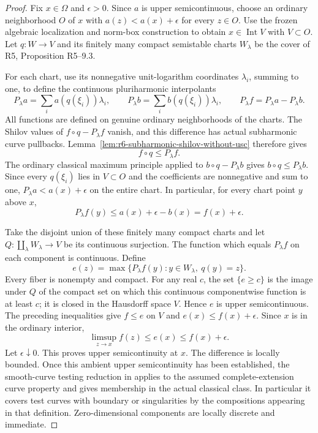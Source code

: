 \documentclass[11pt,a4paper]{article}
\numberwithin{equation}{section}
\theoremstyle{definition}
\theoremstyle{remark}
\begin{document}
\begin{proof}
Fix $x\in\Omega$ and $\epsilon>0$. Since $a$ is upper
semicontinuous, choose an ordinary neighborhood $O$ of $x$ with
$a(z)<a(x)+\epsilon$ for every $z\in O$. Use the frozen algebraic
localization and norm-box construction to obtain $x\in\operatorname{Int}V$
with $V\subset O$. Let $q:W\to V$ and its finitely many compact
semistable charts $W_\lambda$ be the cover of R5, Proposition
\textup{R5--9.3}.

For each chart, use its nonnegative unit-logarithm coordinates
$\lambda_i$, summing to one, to define the continuous pluriharmonic
interpolants
\[
 P_\lambda a=\sum_i a(q(\xi_i))\lambda_i,
 \qquad P_\lambda b=\sum_i b(q(\xi_i))\lambda_i,
 \qquad P_\lambda f=P_\lambda a-P_\lambda b.
\]
All functions are defined on genuine ordinary neighborhoods of the
charts. The Shilov values of $f\circ q-P_\lambda f$ vanish,
and this difference has actual subharmonic curve pullbacks.
Lemma~\ref{lem:r6-subharmonic-shilov-without-usc} therefore gives
\[
                         f\circ q\le P_\lambda f.
\]
The ordinary classical maximum principle applied to
$b\circ q-P_\lambda b$ gives $b\circ q\le P_\lambda b$.
Since every $q(\xi_i)$ lies in $V\subset O$ and the coefficients
are nonnegative and sum to one, $P_\lambda a<a(x)+\epsilon$ on
the entire chart. In particular, for every chart point $y$ above $x$,
\[
             P_\lambda f(y)
                \le a(x)+\epsilon-b(x)=f(x)+\epsilon.
\]

Take the disjoint union of these finitely many compact charts and
let $Q:\coprod_\lambda W_\lambda\to V$ be its continuous
surjection. The function which equals $P_\lambda f$ on each component
is continuous. Define
\[
        e(z)=\max\{P_\lambda f(y):y\in W_\lambda,\ q(y)=z\}.
\]
Every fiber is nonempty and compact. For any real $c$, the set
$\{e\ge c\}$ is the image under $Q$ of the compact set on which
this continuous componentwise function is at least $c$; it is closed
in the Hausdorff space $V$. Hence $e$ is upper semicontinuous.
The preceding inequalities give $f\le e$ on $V$ and
$e(x)\le f(x)+\epsilon$. Since $x$ is in the ordinary interior,
\[
                   \limsup_{z\to x} f(z)
                         \le e(x)\le f(x)+\epsilon.
\]
Let $\epsilon\downarrow0$. This proves upper semicontinuity at
$x$. The difference is locally bounded. Once this ambient upper
semicontinuity has been established, the smooth-curve testing reduction
in \cite[4.1.3 and Definition 3.4]{GR25} applies to the assumed
complete-extension curve property and gives membership in the actual
classical class. In particular it covers test curves with boundary or
singularities by the compositions appearing in that definition.
Zero-dimensional components are locally discrete and immediate.
\end{proof}
\end{document}
